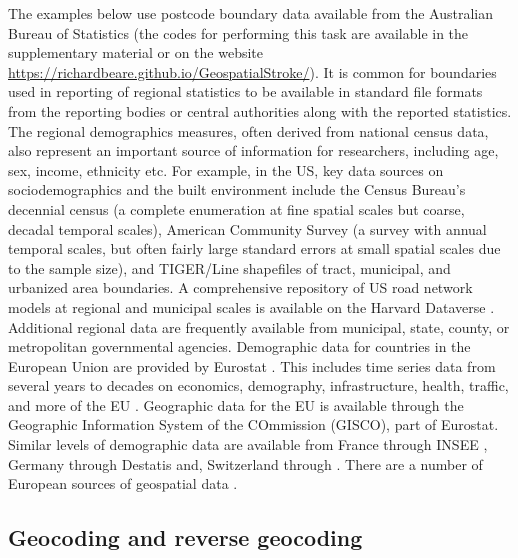\documentclass[utf8]{frontiersHLTH}
\begin{document}
The examples below use postcode boundary data available from the
Australian Bureau of Statistics (the codes for performing this task
are available in the supplementary material or on the website
\href{https://richardbeare.github.io/GeospatialStroke/}{https://richardbeare.github.io/GeospatialStroke/}). It
is common for boundaries used in reporting of regional statistics to
be available in standard file formats from the reporting bodies or
central authorities along with the reported statistics. The regional
demographics measures, often derived from national census data, also
represent an important source of information for researchers,
including age, sex, income, ethnicity etc. For example, in the US, key
data sources on sociodemographics and the built environment include
the Census Bureau's decennial census \cite{us_census_bureau_decennial}
(a complete enumeration at fine spatial scales but coarse, decadal
temporal scales), American Community Survey\cite{us_census_bureau_acs}
(a survey with annual temporal scales, but often fairly large standard
errors at small spatial scales due to the sample size), and TIGER/Line
shapefiles\cite{us_census_tiger_line} of tract, municipal, and
urbanized area boundaries. A comprehensive repository of US road
network models at regional and municipal scales is available on the
Harvard Dataverse \cite{boeing_street_2019}. Additional regional data
are frequently available from municipal, state, county, or
metropolitan governmental agencies. Demographic data for countries in
the European Union are provided by Eurostat \cite{eurostat}. This
includes time series data from several years to decades on economics,
demography, infrastructure, health, traffic, and more of the EU
\cite{Lahti2017}. Geographic data for the EU is available through the
Geographic Information System of the COmmission (GISCO), part of
Eurostat. Similar levels of demographic data are available from France
through INSEE \cite{insee}, Germany through Destatis \cite{destatis}
and, Switzerland through \cite{swiss-bfs}. There are a number of
European sources of geospatial data \cite{diva-gis,germany-gis,swiss-3d}.

\subsection{Geocoding and reverse geocoding}\label{geocoding-and-reverse-geocoding} 
\end{document}

